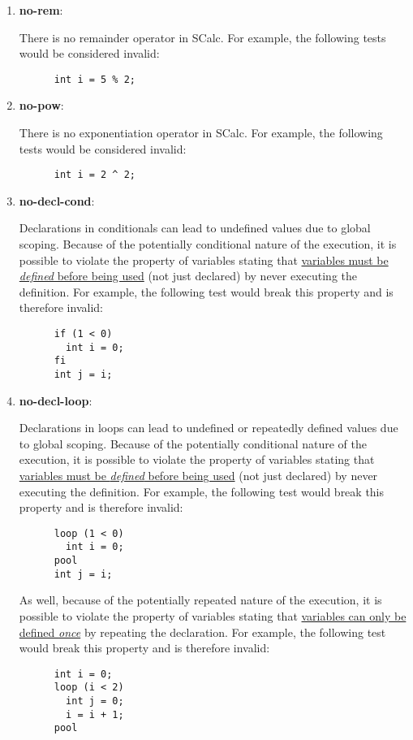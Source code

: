 \documentclass{article}
\newcommand{\clarificationdest}[1]{\hypertarget{#1}{\textbf{#1}:}}
\begin{document}
\begin{enumerate}
  \item
    \clarificationdest{no-rem}
    There is no remainder operator in SCalc. For example, the following tests would be considered
    invalid:
    \begin{lstlisting}
      int i = 5 % 2;
    \end{lstlisting}
  \item
    \clarificationdest{no-pow}
    There is no exponentiation operator in SCalc. For example, the following tests would be
    considered invalid:
    \begin{lstlisting}
      int i = 2 ^ 2;
    \end{lstlisting}
  \item
    \clarificationdest{no-decl-cond}
    Declarations in conditionals can lead to undefined values due to global scoping.  Because of
    the potentially conditional nature of the execution, it is possible to violate the property of
    variables stating that \hyperlink{variable-props}{variables must be \textit{defined} before
    being used} (not just declared) by never executing the definition. For example, the following
    test would break this property and is therefore invalid:
    \begin{lstlisting}
      if (1 < 0)
        int i = 0;
      fi
      int j = i;
    \end{lstlisting}
  \item
    \clarificationdest{no-decl-loop}
    Declarations in loops can lead to undefined or repeatedly defined values due to global scoping.
    Because of the potentially conditional nature of the execution, it is possible to violate the
    property of variables stating that \hyperlink{variable-props}{variables must be
    \textit{defined} before being used} (not just declared) by never executing the definition. For
    example, the following test would break this property and is therefore invalid:
    \begin{lstlisting}
      loop (1 < 0)
        int i = 0;
      pool
      int j = i;
    \end{lstlisting}
    As well, because of the potentially repeated nature of the execution, it is possible to violate
    the property of variables stating that \hyperlink{variable-props}{variables can only be defined
    \textit{once}} by repeating the declaration. For example, the following test would break this
    property and is therefore invalid:
    \begin{lstlisting}
      int i = 0;
      loop (i < 2)
        int j = 0;
        i = i + 1;
      pool
    \end{lstlisting}
\end{enumerate}
\end{document}
